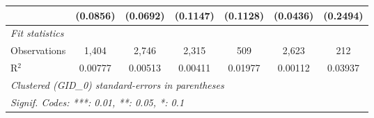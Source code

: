 \begin{table}[H]
\begin{tabular}{lcccccc}
                                         & (0.0856)      & (0.0692)      & (0.1147)     & (0.1128)      & (0.0436) & (0.2494)\\   
      \midrule
      \emph{Fit statistics}\\
      Observations                       & 1,404         & 2,746         & 2,315        & 509           & 2,623    & 212\\  
      R$^2$                              & 0.00777       & 0.00513       & 0.00411      & 0.01977       & 0.00112  & 0.03937\\  
      \midrule \midrule
      \multicolumn{7}{l}{\emph{Clustered (GID\_0) standard-errors in parentheses}}\\
      \multicolumn{7}{l}{\emph{Signif. Codes: ***: 0.01, **: 0.05, *: 0.1}}\\
   \end{tabular}
\end{table}



